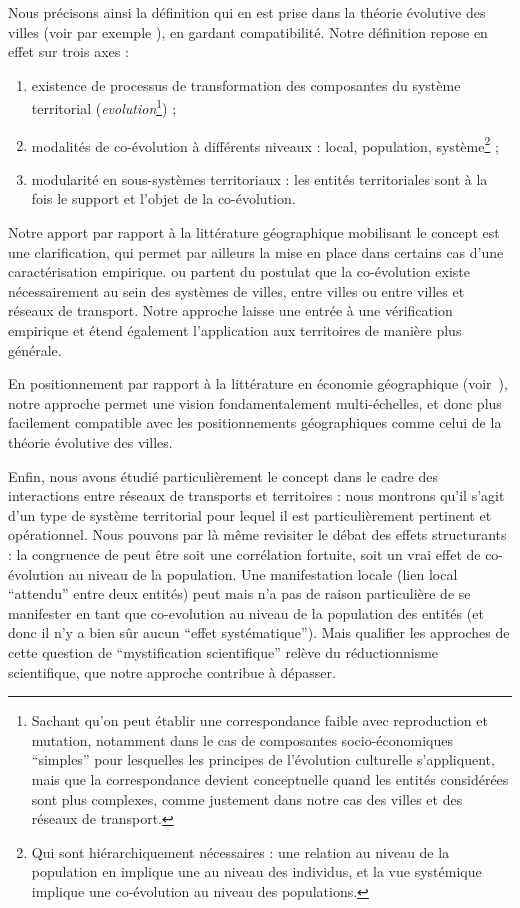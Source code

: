 Nous précisons ainsi la définition qui en est prise dans la théorie évolutive des villes (voir par exemple \cite{paulus2004coevolution}), en gardant compatibilité. Notre définition repose en effet sur trois axes :
\begin{enumerate}
	\item existence de processus de transformation des composantes du système territorial (\emph{evolution}\footnote{Sachant qu'on peut établir une correspondance faible avec reproduction et mutation, notamment dans le cas de composantes socio-économiques ``simples'' pour lesquelles les principes de l'évolution culturelle s'appliquent, mais que la correspondance devient conceptuelle quand les entités considérées sont plus complexes, comme justement dans notre cas des villes et des réseaux de transport.}) ;
	\item modalités de co-évolution à différents niveaux : local, population, système\footnote{Qui sont hiérarchiquement nécessaires : une relation au niveau de la population en implique une au niveau des individus, et la vue systémique implique une co-évolution au niveau des populations.} ;
	\item modularité en sous-systèmes territoriaux : les entités territoriales sont à la fois le support et l'objet de la co-évolution.
\end{enumerate}


Notre apport par rapport à la littérature géographique mobilisant le concept est une clarification, qui permet par ailleurs la mise en place dans certains cas d'une caractérisation empirique. \cite{paulus2004coevolution} ou \cite{bretagnolle1998space} partent du postulat que la co-évolution existe nécessairement au sein des systèmes de villes, entre villes ou entre villes et réseaux de transport. Notre approche laisse une entrée à une vérification empirique et étend également l'application aux territoires de manière plus générale.

En positionnement par rapport à la littérature en économie géographique (voir~\cite{schamp201020}), notre approche permet une vision fondamentalement multi-échelles, et donc plus facilement compatible avec les positionnements géographiques comme celui de la théorie évolutive des villes.

Enfin, nous avons étudié particulièrement le concept dans le cadre des interactions entre réseaux de transports et territoires : nous montrons qu'il s'agit d'un type de système territorial pour lequel il est particulièrement pertinent et opérationnel. Nous pouvons par là même revisiter le débat des effets structurants : la congruence de \cite{offner1993effets} peut être soit une corrélation fortuite, soit un vrai effet de co-évolution au niveau de la population. Une manifestation locale (lien local ``attendu'' entre deux entités) peut mais n'a pas de raison particulière de se manifester en tant que co-evolution au niveau de la population des entités (et donc il n'y a bien sûr aucun ``effet systématique''). Mais qualifier les approches de cette question de ``mystification scientifique'' \cite{offner1993effets} relève du réductionnisme scientifique, que notre approche contribue à dépasser.





